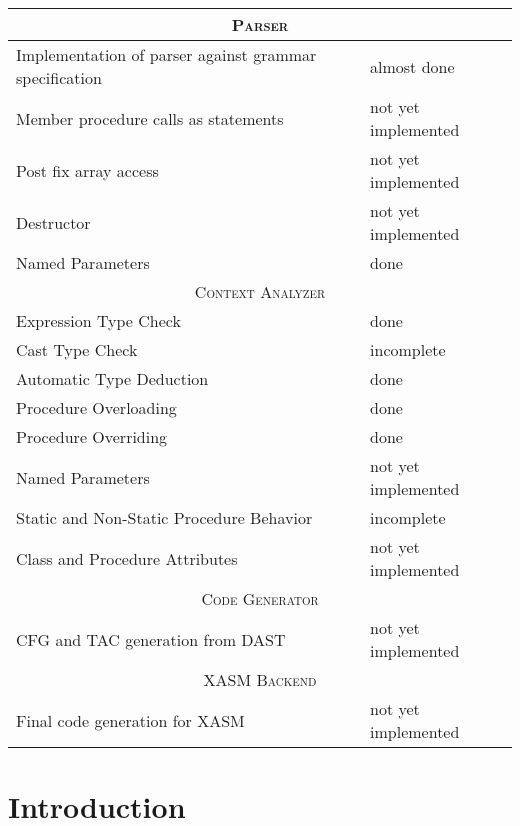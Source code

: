 \documentclass{report}
\def\done{\textcolor{weakGreen}{done}}
\def\almdone{\textcolor{weakYellow}{almost done}}
\def\incompl{\textcolor{weakOrange}{incomplete}}
\def\notimpl{\textcolor{weakRed}{not yet implemented}}
\begin{document}
\begin{center}
\begin{tabular}[ht]{ | p{} | p{} | }
	\hline
	\multicolumn{2}{|c|}{\textsc{Parser}} \\
	\hline
	Implementation of parser against grammar specification & \almdone \\
	\hline
	Member procedure calls as statements & \notimpl \\
	\hline
	Post fix array access & \notimpl \\
	\hline
	Destructor & \notimpl \\
	\hline
	Named Parameters & \done \\
	
	\hline \hline
	\multicolumn{2}{|c|}{\textsc{Context Analyzer}} \\
	\hline
	Expression Type Check & \done \\
	\hline
	Cast Type Check & \incompl \\
	\hline
	Automatic Type Deduction & \done \\
	\hline
	Procedure Overloading & \done \\
	\hline
	Procedure Overriding & \done \\
	\hline
	Named Parameters & \notimpl \\
	\hline
	Static and Non-Static Procedure Behavior & \incompl \\
	\hline
	Class and Procedure Attributes & \notimpl \\
	
	\hline \hline
	\multicolumn{2}{|c|}{\textsc{Code Generator}} \\
	\hline
	CFG and TAC generation from DAST & \notimpl \\
	
	\hline \hline
	\multicolumn{2}{|c|}{\textsc{XASM Backend}} \\
	\hline
	Final code generation for XASM & \notimpl \\
	\hline
\end{tabular}
\end{center}


\tableofcontents



\chapter{Introduction}
\end{document}
